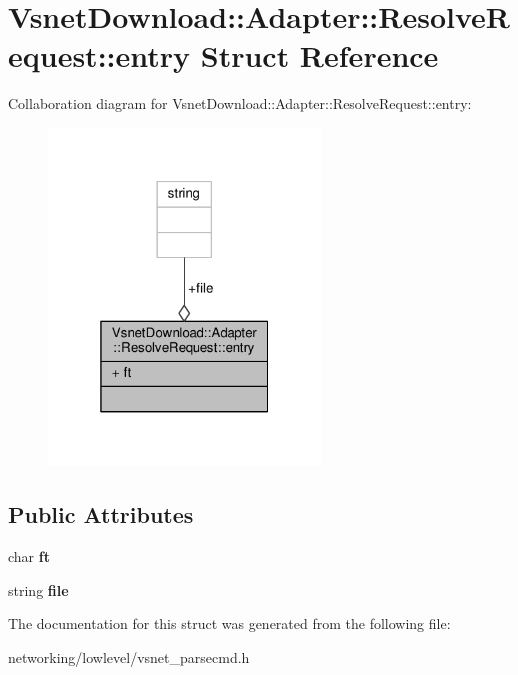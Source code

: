 \hypertarget{structVsnetDownload_1_1Adapter_1_1ResolveRequest_1_1entry}{}\section{Vsnet\+Download\+:\+:Adapter\+:\+:Resolve\+Request\+:\+:entry Struct Reference}
\label{structVsnetDownload_1_1Adapter_1_1ResolveRequest_1_1entry}


Collaboration diagram for Vsnet\+Download\+:\+:Adapter\+:\+:Resolve\+Request\+:\+:entry\+:
\nopagebreak
\begin{figure}[H]
\begin{center}
\leavevmode
\includegraphics[width=205pt]{dd/d79/structVsnetDownload_1_1Adapter_1_1ResolveRequest_1_1entry__coll__graph}
\end{center}
\end{figure}
\subsection*{Public Attributes}
\begin{DoxyCompactItemize}
\item 
char {\bfseries ft}\hypertarget{structVsnetDownload_1_1Adapter_1_1ResolveRequest_1_1entry_a8193decbf2125e065934472958e85ac0}{}\label{structVsnetDownload_1_1Adapter_1_1ResolveRequest_1_1entry_a8193decbf2125e065934472958e85ac0}

\item 
string {\bfseries file}\hypertarget{structVsnetDownload_1_1Adapter_1_1ResolveRequest_1_1entry_a01a0382cbb5a5437208fb74ae982d63d}{}\label{structVsnetDownload_1_1Adapter_1_1ResolveRequest_1_1entry_a01a0382cbb5a5437208fb74ae982d63d}

\end{DoxyCompactItemize}


The documentation for this struct was generated from the following file\+:\begin{DoxyCompactItemize}
\item 
networking/lowlevel/vsnet\+\_\+parsecmd.\+h\end{DoxyCompactItemize}

